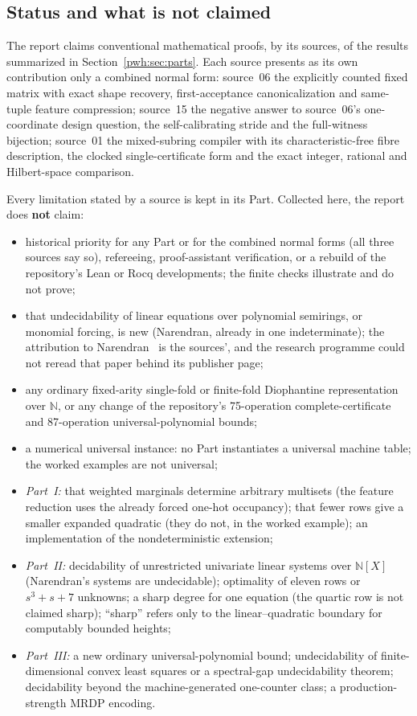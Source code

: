 \documentclass[11pt,letterpaper]{article}
\numberwithin{equation}{section}
\theoremstyle{definition}
\newcommand{\N}{\mathbb N}
\begin{document}
\subsection{Status and what is not claimed}\label{pwh:sec:status}

The report claims conventional mathematical proofs, by its sources, of the
results summarized in Section~\ref{pwh:sec:parts}. Each source presents as
its own contribution only a combined normal form: source~06 the explicitly
counted fixed matrix with exact shape recovery, first-acceptance
canonicalization and same-tuple feature compression; source~15 the
negative answer to source~06's one-coordinate design question, the
self-calibrating stride and the full-witness bijection; source~01 the
mixed-subring compiler with its characteristic-free fibre description, the
clocked single-certificate form and the exact integer, rational and
Hilbert-space comparison.

Every limitation stated by a source is kept in its Part. Collected here,
the report does \textbf{not} claim:
\begin{itemize}
\item historical priority for any Part or for the combined normal forms
(all three sources say so), refereeing, proof-assistant verification, or a
rebuild of the repository's Lean or Rocq developments; the finite checks
illustrate and do not prove;
\item that undecidability of linear equations over polynomial semirings, or
monomial forcing, is new (Narendran, already in one indeterminate); the
attribution to Narendran~\cite{uh:Narendran} is the sources', and the
research programme could not reread that paper behind its publisher page;
\item any ordinary fixed-arity single-fold or finite-fold Diophantine
representation over $\N$, or any change of the repository's 75-operation
complete-certificate and 87-operation universal-polynomial bounds;
\item a numerical universal instance: no Part instantiates a universal
machine table; the worked examples are not universal;
\item \emph{Part~I:} that weighted marginals determine arbitrary multisets
(the feature reduction uses the already forced one-hot occupancy); that
fewer rows give a smaller expanded quadratic (they do not, in the worked
example); an implementation of the nondeterministic extension;
\item \emph{Part~II:} decidability of unrestricted univariate linear
systems over $\N[X]$ (Narendran's systems are undecidable); optimality of
eleven rows or $s^3+s+7$ unknowns; a sharp degree for one equation (the
quartic row is not claimed sharp); ``sharp'' refers only to the
linear--quadratic boundary for computably bounded heights;
\item \emph{Part~III:} a new ordinary universal-polynomial bound;
undecidability of finite-dimensional convex least squares or a spectral-gap
undecidability theorem; decidability beyond the machine-generated
one-counter class; a production-strength MRDP encoding.
\end{itemize}
\end{document}
